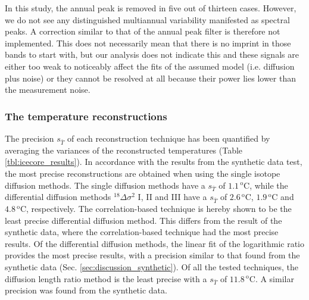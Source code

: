 \documentclass[11pt, draftcls, onecolumn]{IEEEtran} %
\numberwithin{equation}{section}
\numberwithin{table}{section}
\numberwithin{figure}{section}
\begin{document}
In this study, the annual peak is removed in five out of thirteen cases.
However, we do not see any distinguished multiannual variability manifested as spectral peaks.
A correction similar to that of the annual peak filter is therefore not implemented.
This does not necessarily mean that there is no imprint in those bands to start with, 
but our analysis does not indicate this and these signals are either too weak to noticeably 
affect the fits of the assumed model (i.e. diffusion plus noise)
or they cannot be resolved at all because their power lies lower than the measurement noise.


\subsubsection{The temperature reconstructions}
The precision $s_{\bar{T}}$ of each reconstruction technique has been quantified
by averaging the variances of the reconstructed temperatures (Table \ref{tbl:icecore_results}). 
In accordance with the results from the synthetic data test, the most precise reconstructions are obtained when using the single isotope diffusion methods. 
The single diffusion methods have a $s_{\bar{T}}$ of $1.1\,^\mathrm{o}\mathrm{C}$, while the differential diffusion methods ${}^{18}\Delta\sigma^2$ I, II and III
have a $s_{\bar{T}}$ of $2.6\,^\mathrm{o}\mathrm{C}$,
$1.9\,^\mathrm{o}\mathrm{C}$ and $4.8\,^\mathrm{o}\mathrm{C}$, respectively.
The correlation-based technique is hereby shown to be the least precise differential diffusion method.
This differs from the result of the synthetic data, where the correlation-based technique
had the most precise results. 
Of the differential diffusion methods, the linear fit of the logarithmic ratio provides the most precise results, 
with a precision similar to that found from the synthetic data (Sec. \ref{sec:discussion_synthetic}).
Of all the tested techniques, the diffusion length ratio method is the least precise with 
a $s_{\bar{T}}$ of $11.8\,^\mathrm{o}\mathrm{C}$. 
A similar precision was found from the synthetic data.
\end{document}
